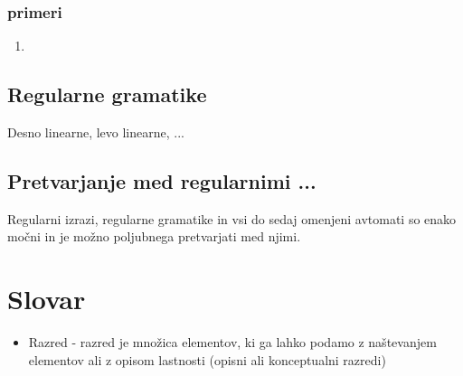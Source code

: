 \documentclass[10pt,a4paper]{article}
\begin{document}
		\subsubsection*{primeri}
			\begin{enumerate}
				\item	
			
			
			\end{enumerate}		
	\subsection{Regularne gramatike}
	Desno linearne, levo linearne, ...
	
	\subsection{Pretvarjanje med regularnimi ...}
	Regularni izrazi, regularne gramatike in vsi do sedaj omenjeni avtomati so enako močni in je možno poljubnega pretvarjati med njimi.

\newpage
\section{Slovar}
\begin{itemize}
\item Razred - razred je množica elementov, ki ga lahko podamo z naštevanjem elementov ali z opisom lastnosti (opisni ali konceptualni razredi)


\end{itemize}
\end{document}
